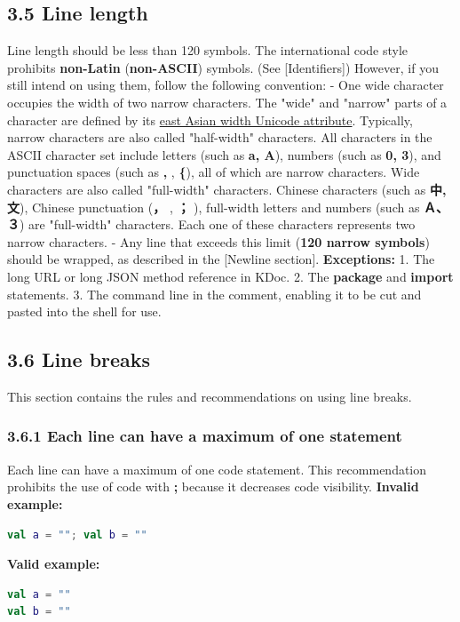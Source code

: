 \subsection*{\textbf{3.5 Line length}}
\label{sec:3.5}
Line length should be less than 120 symbols. The international code style prohibits \textbf{non-Latin} (\textbf{non-ASCII}) symbols.
(See [Identifiers]) However, if you still intend on using them, follow the following convention:
- One wide character occupies the width of two narrow characters.
The "wide" and "narrow" parts of a character are defined by its \href{https://unicode.org/reports/tr11/}{east Asian width Unicode attribute}.
Typically, narrow characters are also called "half-width" characters.
All characters in the ASCII character set include letters (such as \textbf{a, A}), numbers (such as \textbf{0, 3}), and punctuation spaces (such as \textbf{,} , \textbf{\{}), all of which are narrow characters.
Wide characters are also called "full-width" characters. Chinese characters (such as \textbf{中, 文}), Chinese punctuation (\textbf{，} , \textbf{；} ), full-width letters and numbers (such as \textbf{Ａ、３}) are "full-width" characters.
Each one of these characters represents two narrow characters.
- Any line that exceeds this limit (\textbf{120 narrow symbols}) should be wrapped, as described in the [Newline section].
\textbf{Exceptions:}
1.	The long URL or long JSON method reference in KDoc.
2.	The \textbf{package} and \textbf{import} statements.
3.	The command line in the comment, enabling it to be cut and pasted into the shell for use.
\subsection*{\textbf{3.6 Line breaks}}
\label{sec:3.6}
This section contains the rules and recommendations on using line breaks.
\subsubsection*{\textbf{3.6.1 Each line can have a maximum of one statement}}
\leavevmode\newline
\label{sec:3.6.1}
Each line can have a maximum of one code statement. This recommendation prohibits the use of code with \textbf{;} because it decreases code visibility.
\textbf{Invalid example:}
\begin{lstlisting}[language=Kotlin]
val a = ""; val b = ""
\end{lstlisting}
\textbf{Valid example:}
\begin{lstlisting}[language=Kotlin]
val a = ""
val b = ""
\end{lstlisting}
